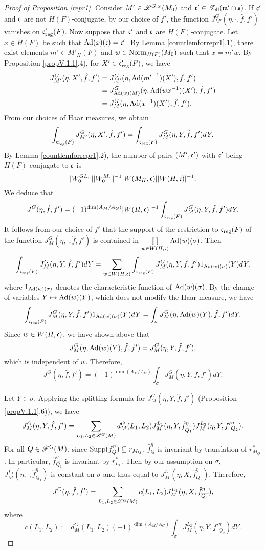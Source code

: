 \documentclass[a4paper]{amsart}
\newcommand{\fm}{{\mathfrak{m}}} \newcommand{\fn}{{\mathfrak{n}}}\newcommand{\fo}{{\mathfrak{o}}} \newcommand{\fp}{{\mathfrak{p}}}
\newcommand{\ov}{\overline}
\theoremstyle{definition}
\theoremstyle{remark}
\numberwithin{equation}{subsection}
\begin{document}
\begin{proof}[Proof of Proposition \ref{repr1}]
Consider $M'\in\mathscr{L}^{G,\omega}(M_0)$ and $\fc'\in\mst_\el(\fm'\cap\fs)$. If ${\mathfrak{c}}'$ and ${\mathfrak{c}}$ are not $H(F)$-conjugate, by our choice of $f'$, the function $J_{M'}^G(\eta,\cdot,\hat{f},f')$ vanishes on ${\mathfrak{c}}'_{\mathrm{reg}}(F)$. Now suppose that ${\mathfrak{c}}'$ and ${\mathfrak{c}}$ are $H(F)$-conjugate. Let $x\in H(F)$ be such that ${\mathrm{Ad}}(x)({\mathfrak{c}})={\mathfrak{c}}'$. By Lemma \ref{countlemforrepr1}.1), there exist elements $m'\in M'_H(F)$ and $w\in{\mathrm{Norm}}_{H(F)}(M_0)$ such that $x=m'w$. By Proposition \ref{propV.1.1}.4), for $X'\in{\mathfrak{c}}'_{\mathrm{reg}}(F)$, we have
\[\begin{split}
 J_{M'}^{G}(\eta, X', \hat{f}, f')&=J_{M'}^{G}(\eta, {\mathrm{Ad}}({m'}^{-1})(X'), \hat{f}, f') \\
&=J_{{\mathrm{Ad}}(w)(M)}^{G}(\eta, {\mathrm{Ad}}(wx^{-1})(X'), \hat{f}, f') \\
&=J_M^G(\eta, {\mathrm{Ad}}(x^{-1})(X'), \hat{f}, f'). 
\end{split}\]
From our choices of Haar measures, we obtain
$$ \int_{{\mathfrak{c}}'_{\mathrm{reg}}(F)} J_{M'}^{G}(\eta, X', \hat{f}, f')=\int_{{\mathfrak{c}}_{\mathrm{reg}}(F)} J_M^G(\eta, Y, \hat{f}, f') dY. $$
By Lemma \ref{countlemforrepr1}.2), the number of pairs $(M',{\mathfrak{c}}')$ with ${\mathfrak{c}}'$ being $H(F)$-conjugate to ${\mathfrak{c}}$ is
$$ |W_0^{GL_n}||W_0^{M_n}|^{-1}|W(M_H,{\mathfrak{c}})||W(H,{\mathfrak{c}})|^{-1}. $$ 
We deduce that
$$ J^G(\eta,\hat{f},f')=(-1)^{\dim(A_M/A_G)} |W(H,{\mathfrak{c}})|^{-1} \int_{{\mathfrak{c}}_{\mathrm{reg}}(F)}  J_M^G(\eta, Y, \hat{f}, f') dY. $$
It follows from our choice of $f'$ that the support of the restriction to ${\mathfrak{c}}_{\mathrm{reg}}(F)$ of the function $J_M^G(\eta, \cdot, \hat{f}, f')$ is contained in $\coprod\limits_{w\in W(H,{\mathfrak{c}})} {\mathrm{Ad}}(w)(\sigma)$. Then
$$ \int_{{\mathfrak{c}}_{\mathrm{reg}}(F)}  J_M^G(\eta, Y, \hat{f}, f') dY=\sum_{w\in W(H,{\mathfrak{c}})} \int_{{\mathfrak{c}}_{\mathrm{reg}}(F)}  J_M^G(\eta, Y, \hat{f}, f') 1_{{\mathrm{Ad}}(w)(\sigma)}(Y) dY, $$
where $1_{{\mathrm{Ad}}(w)(\sigma)}$ denotes the characteristic function of ${\mathrm{Ad}}(w)(\sigma)$. By the change of variables $Y\mapsto{\mathrm{Ad}}(w)(Y)$, which does not modify the Haar measure, we have
$$ \int_{{\mathfrak{c}}_{\mathrm{reg}}(F)}  J_M^G(\eta, Y, \hat{f}, f') 1_{{\mathrm{Ad}}(w)(\sigma)}(Y) dY=\int_{\sigma} J_M^G(\eta, {\mathrm{Ad}}(w)(Y), \hat{f}, f') dY. $$
Since $w\in W(H,{\mathfrak{c}})$, we have shown above that
$$ J_M^G(\eta, {\mathrm{Ad}}(w)(Y), \hat{f}, f')=J_M^G(\eta, Y, \hat{f}, f'), $$
which is independent of $w$. Therefore, 
$$ J^G(\eta,\hat{f},f')=(-1)^{\dim(A_M/A_G)} \int_{\sigma} J_M^G(\eta, Y, \hat{f}, f') dY. $$

Let $Y\in\sigma$. Applying the splitting formula for $J_M^G(\eta, Y, \hat{f}, f')$ (Proposition \ref{propV.1.1}.6)), we have 
$$ J_M^G(\eta, Y, \hat{f}, f')=\sum_{L_1,L_2\in\msl^G(M)} d_M^G(L_1,L_2) J_M^{L_1}(\eta,Y,\hat{f}_{\ov{Q_1}}^\eta) J_M^{L_2}(\eta,Y,{f'}_{Q_2}^\eta). $$
For all $Q\in\mathscr{F}^{G}(M)$, since ${\mathrm{Supp}}(f_Q^\eta)\subseteq r_{M_Q}$, $\hat{f}_Q^\eta$ is invariant by translation of $r_{M_Q}^\ast$. In particular, $\hat{f}_{\ov{Q_1}}^\eta$ is invariant by $r_{L_1}^\ast$. Then by our assumption on $\sigma$, $J_M^{L_1}(\eta, \cdot, \hat{f}_{\ov{Q_1}}^\eta)$ is constant on $\sigma$ and thus equal to $J_M^{L_1}(\eta, X, \hat{f}_{\ov{Q_1}}^\eta)$. Therefore, 
$$ J^G(\eta,\hat{f},f')=\sum_{L_1,L_2\in\msl^G(M)} c(L_1,L_2) J_M^{L_1}(\eta, X, \hat{f}_{\ov{Q_1}}^\eta), $$
where
$$ c(L_1, L_2):=d_M^G(L_1,L_2) (-1)^{\dim(A_M/A_G)} \int_{\sigma} J_M^{L_2}(\eta,Y,{f'}_{Q_2}^\eta) dY. $$


\end{proof}
\end{document}
